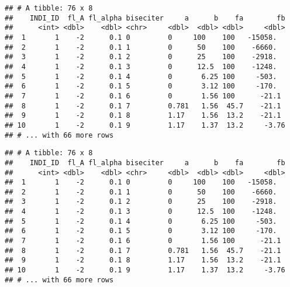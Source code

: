 \documentclass[
]{book}
\newenvironment{Shaded}{\begin{snugshade}}{\end{snugshade}}
\newcommand{\KeywordTok}[1]{\textcolor[rgb]{0.13,0.29,0.53}{\textbf{#1}}}
\newcommand{\NormalTok}[1]{#1}
\newcommand{\OperatorTok}[1]{\textcolor[rgb]{0.81,0.36,0.00}{\textbf{#1}}}
\newcommand{\StringTok}[1]{\textcolor[rgb]{0.31,0.60,0.02}{#1}}
\begin{document}
\begin{Shaded}
\end{Shaded}

\begin{verbatim}
## # A tibble: 76 x 8
##    INDI_ID  fl_A fl_alpha biseciter     a      b    fa        fb
##      <int> <dbl>    <dbl> <chr>     <dbl>  <dbl> <dbl>     <dbl>
##  1       1    -2      0.1 0         0     100    100   -15058.  
##  2       1    -2      0.1 1         0      50    100    -6660.  
##  3       1    -2      0.1 2         0      25    100    -2918.  
##  4       1    -2      0.1 3         0      12.5  100    -1248.  
##  5       1    -2      0.1 4         0       6.25 100     -503.  
##  6       1    -2      0.1 5         0       3.12 100     -170.  
##  7       1    -2      0.1 6         0       1.56 100      -21.1 
##  8       1    -2      0.1 7         0.781   1.56  45.7    -21.1 
##  9       1    -2      0.1 8         1.17    1.56  13.2    -21.1 
## 10       1    -2      0.1 9         1.17    1.37  13.2     -3.76
## # ... with 66 more rows
\end{verbatim}

\begin{Shaded}
\end{Shaded}

\begin{verbatim}
## # A tibble: 76 x 8
##    INDI_ID  fl_A fl_alpha biseciter     a      b    fa        fb
##      <int> <dbl>    <dbl> <chr>     <dbl>  <dbl> <dbl>     <dbl>
##  1       1    -2      0.1 0         0     100    100   -15058.  
##  2       1    -2      0.1 1         0      50    100    -6660.  
##  3       1    -2      0.1 2         0      25    100    -2918.  
##  4       1    -2      0.1 3         0      12.5  100    -1248.  
##  5       1    -2      0.1 4         0       6.25 100     -503.  
##  6       1    -2      0.1 5         0       3.12 100     -170.  
##  7       1    -2      0.1 6         0       1.56 100      -21.1 
##  8       1    -2      0.1 7         0.781   1.56  45.7    -21.1 
##  9       1    -2      0.1 8         1.17    1.56  13.2    -21.1 
## 10       1    -2      0.1 9         1.17    1.37  13.2     -3.76
## # ... with 66 more rows
\end{verbatim}
\end{document}
